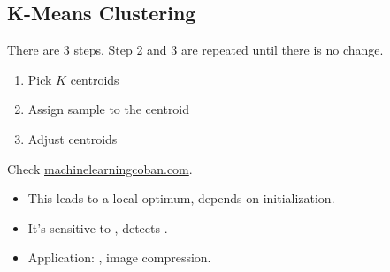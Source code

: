 \subsection{K-Means Clustering}
There are 3 steps. Step 2 and 3 are repeated until there is no change.
\begin{enumerate}
	\item Pick $K$ centroids
	\item Assign sample to the centroid
	\item Adjust centroids
\end{enumerate}
\note Check \href{https://machinelearningcoban.com/2017/01/01/kmeans/}{machinelearningcoban.com}.
\begin{itemize}
	\item This leads to a local optimum, depends on initialization.
	\item It's sensitive to , detects .
	\item Application: \eg, image compression.
\end{itemize}

